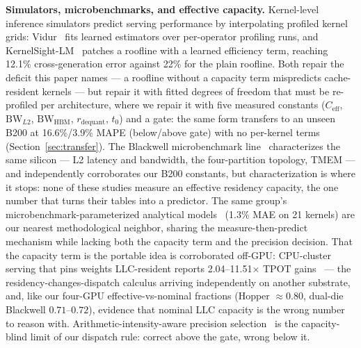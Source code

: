 \documentclass[10pt,twocolumn]{article}
\begin{document}
\textbf{Simulators, microbenchmarks, and effective capacity.}  Kernel-level inference simulators predict serving performance by interpolating profiled kernel grids: Vidur~\cite{vidur} fits learned estimators over per-operator profiling runs, and KernelSight-LM~\cite{yao2026kernelsight} patches a roofline with a learned efficiency term, reaching 12.1\% cross-generation error against 22\% for the plain roofline.  Both repair the deficit this paper names --- a roofline without a capacity term mispredicts cache-resident kernels --- but repair it with fitted degrees of freedom that must be re-profiled per architecture, where we repair it with five measured constants ($C_\text{eff}$, $\mathrm{BW}_{L2}$, $\mathrm{BW}_\text{HBM}$, $r_\text{dequant}$, $t_0$) and a gate: the same form transfers to an unseen B200 at 16.6\%/3.9\% MAPE (below/above gate) with no per-kernel terms (Section~\ref{sec:transfer}).  The Blackwell microbenchmark line~\cite{dissecting2025blackwell,blackwell2025microbench} characterizes the same silicon --- L2 latency and bandwidth, the four-partition topology, TMEM --- and independently corroborates our B200 constants, but characterization is where it stops: none of these studies measure an effective residency capacity, the one number that turns their tables into a predictor.  The same group's microbenchmark-parameterized analytical models~\cite{jarmusch2026analytical} (1.3\% MAE on 21 kernels) are our nearest methodological neighbor, sharing the measure-then-predict mechanism while lacking both the capacity term and the precision decision.  That the capacity term is the portable idea is corroborated off-GPU: CPU-cluster serving that pins weights LLC-resident reports 2.04--11.51$\times$ TPOT gains~\cite{zhang2026cacheresident} --- the residency-changes-dispatch calculus arriving independently on another substrate, and, like our four-GPU effective-vs-nominal fractions (Hopper ${\approx}0.80$, dual-die Blackwell $0.71$--$0.72$), evidence that nominal LLC capacity is the wrong number to reason with.  Arithmetic-intensity-aware precision selection~\cite{aiaq2025} is the capacity-blind limit of our dispatch rule: correct above the gate, wrong below it.
\end{document}
